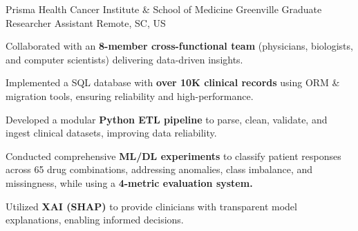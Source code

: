 
\vspace*{-0.2cm}

\begin{cventries}


\cventry
    {Prisma Health Cancer Institute \hspace{0.1cm} \& \hspace{0.1cm} School of Medicine Greenville}
    {Graduate Researcher Assistant}
    {}
    {Remote, SC, US}
    {
        \begin{cvitemsfree}
            \item{Collaborated with an \textbf{8-member cross-functional team} (physicians, biologists, and computer scientists) delivering data-driven insights.}
            \item{Implemented a SQL database with \textbf{over 10K clinical records} using ORM \& migration tools, ensuring reliability and high-performance.} %
            \item{Developed a modular \textbf{Python ETL pipeline} to parse, clean, validate, and ingest clinical datasets, improving data reliability.}
            \item{Conducted comprehensive \textbf{ML/DL experiments} to classify patient responses across 65 drug combinations, addressing anomalies, class imbalance, and missingness, while using a \textbf{4-metric evaluation system.}}
            \item{Utilized \textbf{XAI (SHAP)} to provide clinicians with transparent model explanations, enabling informed decisions.}
        \end{cvitemsfree}
    }

\vspace*{0.2cm}


\end{cventries}
